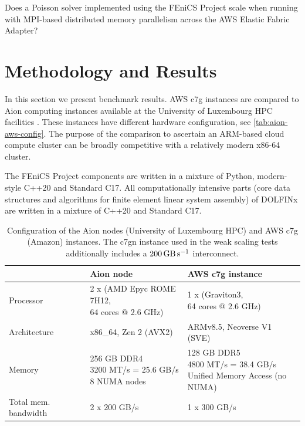Does a Poisson solver implemented using the FEniCS Project scale when running
with MPI-based distributed memory parallelism across the AWS Elastic Fabric
Adapter?

\section*{Methodology and Results}
In this section we present benchmark results. AWS c7g instances are compared to
Aion computing instances available at the University of Luxembourg HPC
facilities \cite{VCPKVO_HPCCT22}. These instances have different hardware
configuration, see \autoref{tab:aion-aws-config}. The purpose of the comparison
to ascertain an ARM-based cloud compute cluster can be broadly competitive with
a relatively modern x86-64 cluster.

The FEniCS Project components are written in a mixture of Python, modern-style
C++20 and Standard C17. All computationally intensive parts (core data
structures and algorithms for finite element linear system assembly) of DOLFINx
are written in a mixture of C++20 and Standard C17.


\begin{table}
  \footnotesize
  \renewcommand{\arraystretch}{1.5}
  \begin{tabular}{l|l|l}
                              & Aion node                                                          & AWS c7g instance \\ \hline \hline
    Processor                 & \makecell[l]{2 x (AMD Epyc ROME 7H12, \\ 64 cores @ 2.6 GHz)}      & \makecell[l]{1 x (Graviton3, \\ 64 cores @ 2.6 GHz)} \\ \hline
    Architecture              & x86\_64, Zen 2 (AVX2)                                              & ARMv8.5, Neoverse V1 (SVE) \\ \hline
    Memory                    & \makecell[l]{256 GB DDR4 \\ 3200 MT/s = 25.6 GB/s \\ 8 NUMA nodes} & \makecell[l]{128 GB DDR5 \\ 4800 MT/s = 38.4 GB/s \\ Unified Memory Access (no NUMA) } \\ \hline
    Total mem. bandwidth      & 2 x 200 GB/s                                                       & 1 x 300 GB/s \\ \hline
  \end{tabular}
  \vspace{5pt}
  \caption{Configuration of the Aion nodes (University of Luxembourg HPC) and AWS c7g (Amazon) instances. The c7gn instance used in the weak scaling tests additionally includes a $\SI{200}{\giga\byte\per\second}$ interconnect.}
  \label{tab:aion-aws-config}
\end{table}

